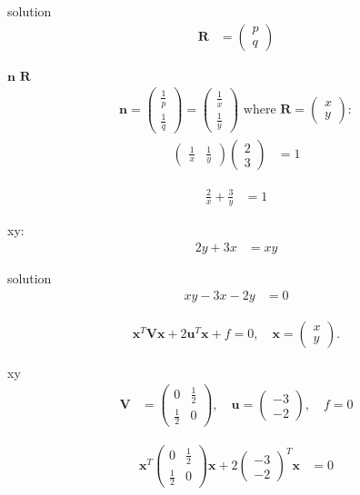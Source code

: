 \documentclass{beamer}
\numberwithin{equation}{section}
\theoremstyle{remark}
\newcommand{\myvec}[1]{\ensuremath{\begin{pmatrix}#1\end{pmatrix}}}
\let\vec\mathbf
\begin{document}
\begin{frame}{solution}
\begin{align}
\vec{R} &= \myvec{p\\[3pt]q}
\end{align}

 $\vec{n}$  $\vec{R}$ 
\begin{align}
\vec{n}=\myvec{\tfrac{1}{p}\\[3pt]\tfrac{1}{q}}=\myvec{\tfrac{1}{x}\\[3pt]\tfrac{1}{y}}\text{ where } \vec{R}=\myvec{x\\y}:
\end{align}
\begin{align}
\myvec{\tfrac{1}{x} & \tfrac{1}{y}}\myvec{2\\3} &= 1
\end{align}


\begin{align}
\tfrac{2}{x} + \tfrac{3}{y} &= 1
\end{align}

 xy:
\begin{align}
2y + 3x &= xy
\end{align}
\end{frame}
\begin{frame}{solution}
\begin{align}
xy - 3x - 2y &= 0
\end{align}

\begin{align}
\vec{x}^T \vec{V} \vec{x} + 2 \vec{u}^T \vec{x} + f = 0, \quad \vec{x} = \myvec{x\\y}.
\end{align}



 xy 
\begin{align}
\vec{V} &= \myvec{0 & \tfrac{1}{2} \\[1mm] \tfrac{1}{2} & 0}, \quad
\vec{u} = \myvec{-3\\-2}, \quad f = 0
\end{align}

\begin{align}
\vec{x}^T \myvec{0 & \tfrac{1}{2} \\[1mm] \tfrac{1}{2} & 0} \vec{x} + 2 \myvec{-3\\-2}^T \vec{x} &= 0
\end{align}

\end{frame}
\end{document}
